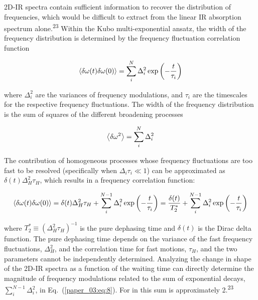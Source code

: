 \documentclass[]{article}
\begin{document}
2D-IR spectra contain sufficient information to recover the distribution of frequencies, which would be difficult to extract from the linear IR absorption spectrum alone.\textsuperscript{23} Within the Kubo multi-exponential ansatz, the width of the frequency distribution is determined by the frequency fluctuation correlation function

\begin{equation}
  \label{paper_03:eq:6}
  \Braket{\delta\omega(t)\delta\omega(0)} = \sum_{i}^{N} \Delta_{i}^{2}\exp\left( - \frac{t}{\tau_{i}} \right)
\end{equation}

where \(\Delta_{i}^{2}\) are the variances of frequency modulations, and \(\tau_{i}\) are the timescales for the respective frequency fluctuations. The width of the frequency distribution is the sum of squares of the different broadening processes

\begin{equation}
  \label{paper_03:eq:7}
  \Braket{\delta\omega^{2}} = \sum_{i}^{N} \Delta_{i}^{2}
\end{equation}

The contribution of homogeneous processes whose frequency fluctuations are too fast to be resolved (specifically when \(\Delta_{i}\tau_{i} \ll 1\)) can be approximated as \(\delta(t)\Delta_{H}^{2}\tau_{H}\), which results in a frequency correlation function:

\begin{equation}
  \label{paper_03:eq:8}
  \Braket{\delta\omega(t)\delta\omega(0)} = \delta(t)\Delta_{H}^{2}\tau_{H} + \sum_{i}^{N - 1}{\Delta_{i}^{2}\exp\left( - \frac{t}{\tau_{i}} \right)} = \frac{\delta(t)}{T_{2}^{*}} + \sum_{i}^{N - 1}{\Delta_{i}^{2}\exp\left( - \frac{t}{\tau_{i}} \right)}
\end{equation}

where \(T_{2}^{*} \equiv \left( \Delta_{H}^{2}\tau_{H} \right)^{- 1}\) is the pure dephasing time and \(\delta(t)\) is the Dirac delta function. The pure dephasing time depends on the variance of the fast frequency fluctuations, \(\Delta_{H}^{2}\), and the correlation time for fast motions, \(\tau_{H}\), and the two parameters cannot be independently determined. Analyzing the change in shape of the 2D-IR spectra as a function of the waiting time can directly determine the magnitude of frequency modulations related to the sum of exponential decays, \(\sum_{i}^{N - 1}\Delta_{i}^{2}\), in Eq.~(\ref{paper_03:eq:8}). For  in \ce{[C4C1im][PF6]} this sum is approximately \SI{2}{\wavenumber}.\textsuperscript{23}
\end{document}
